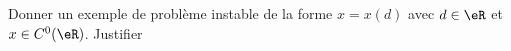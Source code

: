 
\begin{exercice}\label{exoSerieUn0003}

Donner un exemple de problème instable de la forme  $x=x(d)$ avec $d\in\eR$ et $x \in C^0(\eR)$. Justifier

\end{exercice}
